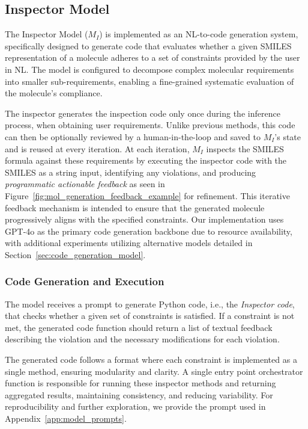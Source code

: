 \documentclass[10pt]{article} %
\begin{document}
    \subsection{Inspector Model}
    \label{sec:inpector}
    The Inspector Model ($M_I$) is implemented as an NL-to-code generation system, specifically designed to generate code that evaluates whether a given SMILES representation of a molecule adheres to a set of constraints provided by the user in NL. The model is configured to decompose complex molecular requirements into smaller sub-requirements, enabling a fine-grained systematic evaluation of the molecule's compliance.

    The inspector generates the inspection code only once during the inference process, when obtaining user requirements. Unlike previous methods, this code can then be optionally reviewed by a human-in-the-loop and saved to $M_I$'s state and is reused at every iteration.
    At each iteration, $M_I$ inspects the SMILES formula against these requirements by executing the inspector code with the SMILES as a string input, identifying any violations, and producing \emph{programmatic actionable feedback} as seen in Figure~\ref{fig:mol_generation_feedback_example} for refinement. This iterative feedback mechanism is intended to ensure that the generated molecule progressively aligns with the specified constraints. Our implementation uses GPT-4o as the primary code generation backbone due to resource availability, with additional experiments utilizing alternative models detailed in Section~\ref{sec:code_generation_model}.

    

    \subsubsection{Code Generation and Execution}
    The model receives a prompt to generate Python code, i.e., the \emph{Inspector code}, that checks whether a given set of constraints is satisfied. If a constraint is not met, the generated code function should return a list of textual feedback describing the violation and the necessary modifications for each violation.
    
    The generated code follows a format where 
    each constraint is implemented as a single method, ensuring modularity and clarity. A single entry point orchestrator function is responsible for running these inspector methods and returning aggregated results, maintaining consistency, and reducing variability. For reproducibility and further exploration, we provide the prompt used in Appendix~\ref{app:model_prompts}.
\end{document}
